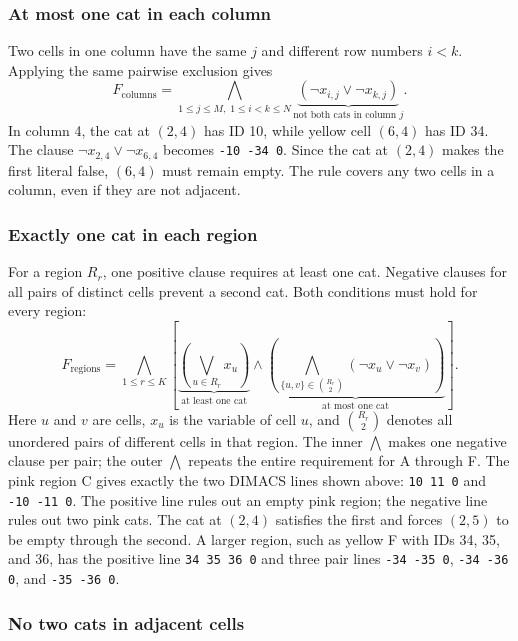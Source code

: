 \subsubsection{At most one cat in each column}

Two cells in one column have the same $j$ and different row numbers $i<k$. Applying the same pairwise exclusion gives
\[
F_{\mathrm{columns}}=
\bigwedge_{1\le j\le M,\;1\le i<k\le N}
\underbrace{(\neg x_{i,j}\lor\neg x_{k,j})}_{\text{not both cats in column }j}.
\]
In column 4, the cat at $(2,4)$ has ID 10, while yellow cell $(6,4)$ has ID 34. The clause $\neg x_{2,4}\lor\neg x_{6,4}$ becomes \texttt{-10 -34 0}. Since the cat at $(2,4)$ makes the first literal false, $(6,4)$ must remain empty. The rule covers any two cells in a column, even if they are not adjacent.

\subsubsection{Exactly one cat in each region}

For a region $R_r$, one positive clause requires at least one cat. Negative clauses for all pairs of distinct cells prevent a second cat. Both conditions must hold for every region:
\[
F_{\mathrm{regions}}=
\bigwedge_{1\le r\le K}
\left[
\underbrace{\left(\bigvee_{u\in R_r}x_u\right)}_{\text{at least one cat}}
\land
\underbrace{\left(\bigwedge_{\{u,v\}\in\binom{R_r}{2}}
(\neg x_u\lor\neg x_v)\right)}_{\text{at most one cat}}
\right].
\]
Here $u$ and $v$ are cells, $x_u$ is the variable of cell $u$, and $\binom{R_r}{2}$ denotes all unordered pairs of different cells in that region. The inner $\bigwedge$ makes one negative clause per pair; the outer $\bigwedge$ repeats the entire requirement for A through F. The pink region C gives exactly the two DIMACS lines shown above: \texttt{10 11 0} and \texttt{-10 -11 0}. The positive line rules out an empty pink region; the negative line rules out two pink cats. The cat at $(2,4)$ satisfies the first and forces $(2,5)$ to be empty through the second. A larger region, such as yellow F with IDs 34, 35, and 36, has the positive line \texttt{34 35 36 0} and three pair lines \texttt{-34 -35 0}, \texttt{-34 -36 0}, and \texttt{-35 -36 0}.

\subsubsection{No two cats in adjacent cells}

